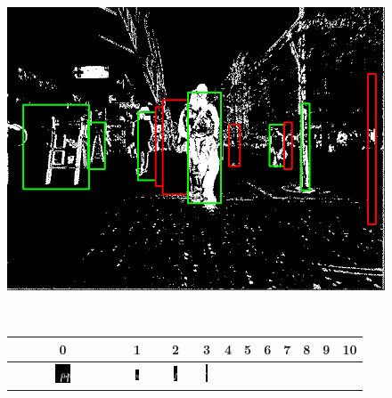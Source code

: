 \begin{figure}[h!]
  \begin{minipage}{\textwidth}
    \centering
    \includegraphics[width=\textwidth]{thresholdedPolar}
    \end{minipage}\hfill~
  \begin{minipage}{\textwidth}
    \centering
    \begin{tabular}{ |c|c|c|c|c|c|c|c|c|c|c|}
      \hline
      0 & 1 & 2 & 3 & 4 & 5 & 6 & 7 & 8 & 9 & 10 \\
      \hline
      \includegraphics[width=0.15\textwidth, height=0.15\textwidth]{obstacleFilter/roi0} &
      \includegraphics[width=0.15\textwidth, height=0.15\textwidth]{obstacleFilter/roi1} &
      \includegraphics[width=0.15\textwidth, height=0.15\textwidth]{obstacleFilter/roi2} &
      \includegraphics[width=0.15\textwidth, height=0.15\textwidth]{obstacleFilter/roi3} &

\end{tabular}
\end{minipage}
\end{figure}
